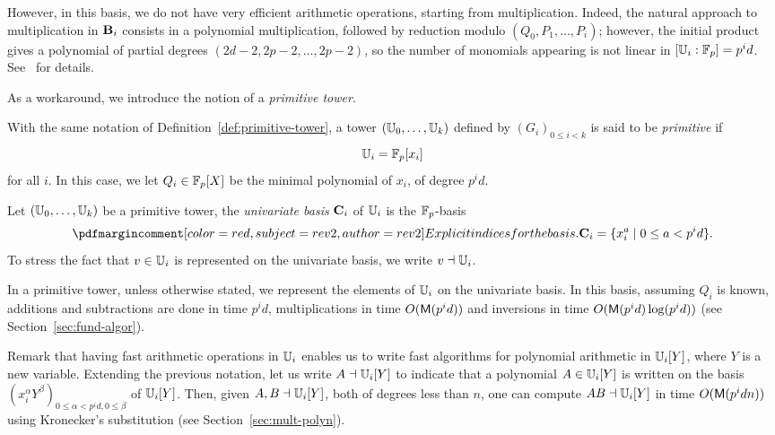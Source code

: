 However, in this basis, we do not have very efficient arithmetic
operations, starting from multiplication. Indeed, the natural approach
to multiplication in $\mathbf{B}_i$ consists in a polynomial multiplication,
followed by reduction modulo $(Q_0,P_1,\dots,P_i)$; however, the
initial product gives a polynomial of partial degrees
$(2d-2,2p-2,\dots,2p-2)$, so the number of monomials appearing is not
linear in $[\mathbb{U}_i:\mathbb{F}_p]=p^id$.  See~\cite{li+moreno+schost07} for
details.

As a workaround, we introduce the notion of a {\em primitive tower}.

\begin{definition}
  With the same notation of Definition~\ref{def:primitive-tower}, a
  tower $(\mathbb{U}_0,\ldots,\mathbb{U}_k)$ defined by $(G_i)_{0 \le i < k}$ is said
  to be \emph{primitive} if
  \begin{equation}
    \label{eq:59}
    \mathbb{U}_i = \mathbb{F}_p[x_i]
  \end{equation}
  for all $i$. In this case, we let $Q_i\in \mathbb{F}_p[X]$ be the minimal
  polynomial of $x_i$, of degree $p^id$.
\end{definition}

\begin{definition}
  Let $(\mathbb{U}_0,\ldots,\mathbb{U}_k)$ be a primitive tower, the \emph{univariate
    basis} $\mathbf{C}_i$ of $\mathbb{U}_i$ is the $\mathbb{F}_p$-basis
  \begin{equation}
    \pdfmctwo{Explicit indices for the basis.}
    \basis{C}_i=\{x_i^a \;|\; 0\le a<p^id\}
    \text{.}  
  \end{equation}
  To stress the fact that $v\in\mathbb{U}_i$ is represented on the univariate
  basis, we write $v\dashv\mathbb{U}_i$.
\end{definition}

In a primitive tower, unless otherwise stated, we represent the
elements of $\mathbb{U}_i$ on the univariate basis. In this basis, assuming
$Q_i$ is known, additions and subtractions are done in time $p^id$,
multiplications in time $O(\mathsf{M}(p^id))$ and inversions in time
$O(\mathsf{M}(p^id)\log(p^id))$ (see Section~\ref{sec:fund-algor}).

Remark that having fast arithmetic operations in $\mathbb{U}_i$ enables us to
write fast algorithms for polynomial arithmetic in $\mathbb{U}_i[Y]$, where
$Y$ is a new variable. Extending the previous notation, let us write
$A \dashv\mathbb{U}_i[Y]$ to indicate that a polynomial $A \in \mathbb{U}_i[Y]$ is
written on the basis $(x_i^\alpha Y^\beta)_{0 \le \alpha < p^id, 0 \le
  \beta}$ of $\mathbb{U}_i[Y]$.  Then, given $A,B \dashv \mathbb{U}_i[Y]$, both of
degrees less than $n$, one can compute $AB \dashv \mathbb{U}_i[Y]$ in time
$O(\mathsf{M}(p^id n))$ using Kronecker's substitution (see
Section~\ref{sec:mult-polyn}).

